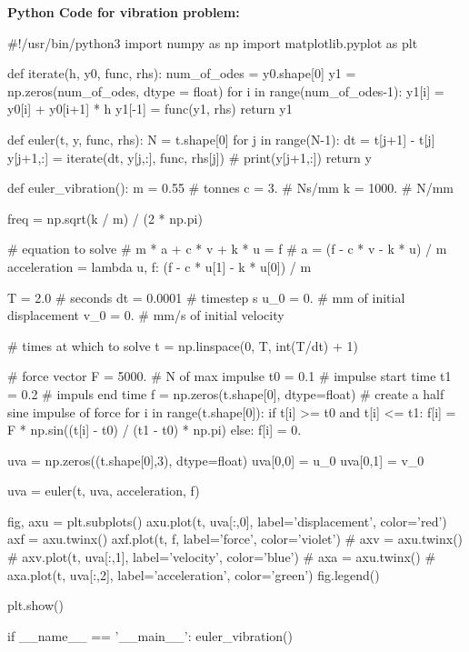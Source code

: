 \documentclass[10pt,b5paper,titlepage]{book}
\begin{document}
\newpage
\textbf{Python Code for vibration problem:}

\begin{python}
#!/usr/bin/python3
import numpy as np
import matplotlib.pyplot as plt


def iterate(h, y0, func, rhs):
    num_of_odes = y0.shape[0]
    y1 = np.zeros(num_of_odes, dtype = float)
    for i in range(num_of_odes-1):
        y1[i] = y0[i] + y0[i+1] * h
    y1[-1] = func(y1, rhs)
    return y1


def euler(t, y, func, rhs):
    N = t.shape[0]
    for j in range(N-1):
        dt = t[j+1] - t[j]
        y[j+1,:] = iterate(dt, y[j,:], func, rhs[j])
        # print(y[j+1,:])
    return y


def euler_vibration():
    m = 0.55  # tonnes
    c = 3.    # Ns/mm
    k = 1000. # N/mm

    freq = np.sqrt(k / m) / (2 * np.pi)

    # equation to solve
    # m * a + c * v + k * u = f
    # a = (f - c * v - k * u) / m
    acceleration = lambda u, f: (f - c * u[1] - k * u[0]) / m

    T = 2.0     # seconds
    dt = 0.0001 # timestep s
    u_0 = 0.    # mm of initial displacement
    v_0 = 0.    # mm/s of initial velocity

    # times at which to solve
    t = np.linspace(0, T, int(T/dt) + 1)

    # force vector
    F = 5000. # N of max impulse
    t0 = 0.1  # impulse start time
    t1 = 0.2  # impuls end time
    f = np.zeros(t.shape[0], dtype=float)
    # create a half sine impulse of force
    for i in range(t.shape[0]):
        if t[i] >= t0 and t[i] <= t1:
            f[i] = F * np.sin((t[i] - t0) / (t1 - t0) * np.pi)
        else:
            f[i] = 0.

    uva = np.zeros((t.shape[0],3), dtype=float)
    uva[0,0] = u_0
    uva[0,1] = v_0

    uva = euler(t, uva, acceleration, f)

    fig, axu = plt.subplots()
    axu.plot(t, uva[:,0], label='displacement', color='red')
    axf = axu.twinx()
    axf.plot(t, f, label='force', color='violet')
    # axv = axu.twinx()
    # axv.plot(t, uva[:,1], label='velocity', color='blue')
    # axa = axu.twinx()
    # axa.plot(t, uva[:,2], label='acceleration', color='green')
    fig.legend()

    plt.show()

if __name__ == '__main__':
    euler_vibration()

\end{python}
\end{document}
